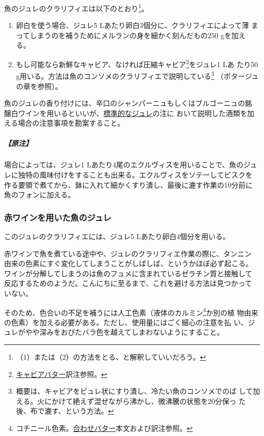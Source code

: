 \begin{recette}
魚のジュレのクラリフィエは以下のとおり\footnote{（1）または（2）の方法をとる、と解釈していいだろう。}。

\begin{enumerate}
\def\labelenumi{\arabic{enumi}.}
\item
  卵白を使う場合、ジュレ5 Lあたり卵白3個分に、クラリフィエによって薄
  まってしまうのを補うためにメルランの身を細かく刻んだもの250 gを加え
  る。
\item
  もし可能なら新鮮なキャビア、なければ圧縮キャビア\footnote{\protect\hyperlink{beurre-de-caviar}{キャビアバター}訳注参照。}をジュレ1
  Lあ たり50
  g用いる。方法は魚のコンソメのクラリフィエで説明している\footnote{概要は、キャビアをピュレ状にすり潰し、冷たい魚のコンソメでのば
    して加える。火にかけて絶えず混ぜながら沸かし、微沸騰の状態を20分保っ
    た後、布で漉す、という方法。} （ポタージュの章を参照）。
\end{enumerate}

魚のジュレの香り付けには、辛口のシャンパーニュもしくはブルゴーニュの銘
醸白ワインを用いるといいが、\protect\hyperlink{gelees-ordinaires}{標準的なジュレ}の注に
おいて説明した酒類を加える場合の注意事項を勘案すること。

\hypertarget{nota-gelee-de-poisson-blanche}{%
\subparagraph{【原注】}\label{nota-gelee-de-poisson-blanche}}

場合によっては、ジュレ1 Lあたり4尾のエクルヴィスを用いることで、魚のジュ
レに独特の風味付けをすることも出来る。エクルヴィスをソテーしてビスクを
作る要領で煮てから、鉢に入れて細かくすり潰し、最後に漉す作業の10分前に
魚のフォンに加える。

\maeaki

\hypertarget{gelee-de-poisson-au-vin-rouge}{%
\subsubsection{赤ワインを用いた魚のジュレ}\label{gelee-de-poisson-au-vin-rouge}}



このジュレのクラリフィエには、ジュレ5 Lあたり卵白4個分を用いる。

赤ワインで魚を煮ている途中や、ジュレのクラリフィエ作業の際に、タンニン
由来の色素にすぐ変化してしまうことがしばしば、というかほぼ必ず起こる。
ワインが分解してしまうのは魚のフュメに含まれているゼラチン質と接触して
反応するためのようだ。こんにちに至るまで、これを避ける方法は見つかって
いない。

そのため、色合いの不足を補うには人工色素（液体のカルミン\footnote{コチニール色素。\protect\hyperlink{beurres-composes}{合わせバター}本文および訳注参照。}か別の植
物由来の色素）を加える必要がある。ただし、使用量にはごく細心の注意を払
い、ジュレがやや深みをおびたバラ色を越えてしまわないようにすること。
\end{recette}
